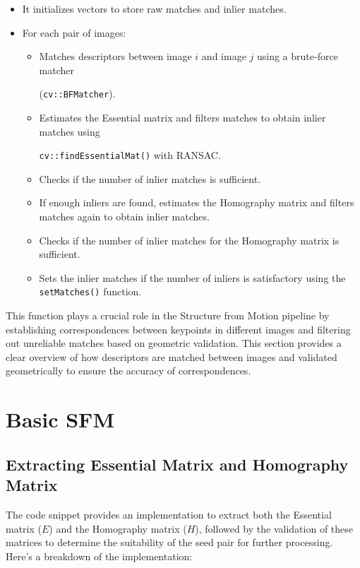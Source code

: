 \documentclass{article}
\begin{document}
\begin{itemize}
  \item It initializes vectors to store raw matches and inlier matches.
  \item For each pair of images:
    \begin{itemize}
      \item Matches descriptors between image $i$ and image $j$ using a brute-force matcher 
      
      (\texttt{cv::BFMatcher}).
      \item Estimates the Essential matrix and filters matches to obtain inlier matches using 
      
      \texttt{cv::findEssentialMat()} with RANSAC.
      \item Checks if the number of inlier matches is sufficient.
      \item If enough inliers are found, estimates the Homography matrix and filters matches again to obtain inlier matches.
      \item Checks if the number of inlier matches for the Homography matrix is sufficient.
      \item Sets the inlier matches if the number of inliers is satisfactory using the \texttt{setMatches()} function.
    \end{itemize}
\end{itemize}

This function plays a crucial role in the Structure from Motion pipeline by establishing correspondences between keypoints in different images and filtering out unreliable matches based on geometric validation.
This section provides a clear overview of how descriptors are matched between images and validated geometrically to ensure the accuracy of correspondences.


\section{Basic SFM}
\subsection{Extracting Essential Matrix and Homography Matrix}
The code snippet provides an implementation to extract both the Essential matrix ($E$) and the Homography matrix ($H$), followed by the validation of these matrices to determine the suitability of the seed pair for further processing. Here's a breakdown of the implementation:
\end{document}

